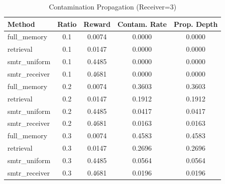 \begin{table}[t]
\caption{Contamination Propagation (Receiver=3)}
\label{tab:receiver3_contamination}
\centering
\begin{tabular}{l c c c c}
\toprule
Method & Ratio & Reward & Contam. Rate & Prop. Depth \\
\midrule
full\_memory & 0.1 & 0.0074 & 0.0000 & 0.0000 \\
retrieval & 0.1 & 0.0147 & 0.0000 & 0.0000 \\
smtr\_uniform & 0.1 & 0.4485 & 0.0000 & 0.0000 \\
smtr\_receiver & 0.1 & 0.4681 & 0.0000 & 0.0000 \\
\midrule
full\_memory & 0.2 & 0.0074 & 0.3603 & 0.3603 \\
retrieval & 0.2 & 0.0147 & 0.1912 & 0.1912 \\
smtr\_uniform & 0.2 & 0.4485 & 0.0417 & 0.0417 \\
smtr\_receiver & 0.2 & 0.4681 & 0.0163 & 0.0163 \\
\midrule
full\_memory & 0.3 & 0.0074 & 0.4583 & 0.4583 \\
retrieval & 0.3 & 0.0147 & 0.2696 & 0.2696 \\
smtr\_uniform & 0.3 & 0.4485 & 0.0564 & 0.0564 \\
smtr\_receiver & 0.3 & 0.4681 & 0.0196 & 0.0196 \\
\bottomrule
\end{tabular}
\end{table}